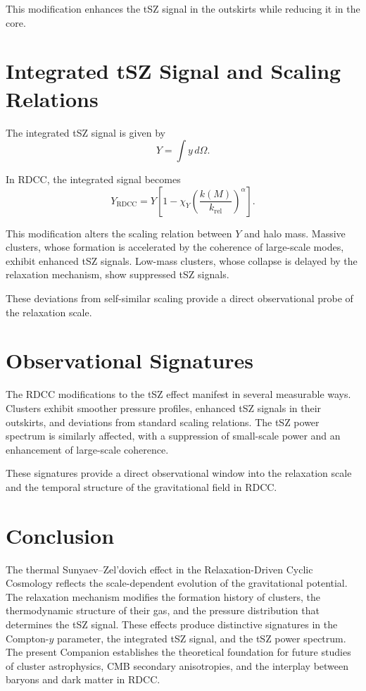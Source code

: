 \documentclass[11pt,a4paper]{article}
\begin{document}
This modification enhances the tSZ signal in the outskirts while reducing it in 
the core.
\section{Integrated tSZ Signal and Scaling Relations}

The integrated tSZ signal is given by
\begin{equation}
    Y = \int y\,d\Omega.
\end{equation}

In RDCC, the integrated signal becomes
\begin{equation}
    Y_{\mathrm{RDCC}}
    = Y
      \left[
        1 - \chi_{Y}
        \left(\frac{k(M)}{k_{\mathrm{rel}}}\right)^{\alpha}
      \right].
\end{equation}

This modification alters the scaling relation between $Y$ and halo mass. Massive 
clusters, whose formation is accelerated by the coherence of large-scale modes, 
exhibit enhanced tSZ signals. Low-mass clusters, whose collapse is delayed by the 
relaxation mechanism, show suppressed tSZ signals.

These deviations from self-similar scaling provide a direct observational probe of 
the relaxation scale.
\section{Observational Signatures}

The RDCC modifications to the tSZ effect manifest in several measurable ways. 
Clusters exhibit smoother pressure profiles, enhanced tSZ signals in their 
outskirts, and deviations from standard scaling relations. The tSZ power spectrum 
is similarly affected, with a suppression of small-scale power and an enhancement 
of large-scale coherence.

These signatures provide a direct observational window into the relaxation scale 
and the temporal structure of the gravitational field in RDCC.
\section{Conclusion}

The thermal Sunyaev--Zel'dovich effect in the Relaxation-Driven Cyclic Cosmology 
reflects the scale-dependent evolution of the gravitational potential. The 
relaxation mechanism modifies the formation history of clusters, the thermodynamic 
structure of their gas, and the pressure distribution that determines the tSZ 
signal. These effects produce distinctive signatures in the Compton-$y$ parameter, 
the integrated tSZ signal, and the tSZ power spectrum. The present Companion 
establishes the theoretical foundation for future studies of cluster astrophysics, 
CMB secondary anisotropies, and the interplay between baryons and dark matter in 
RDCC.
\end{document}
